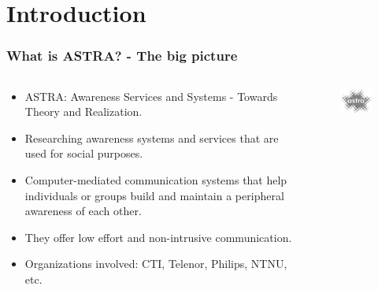 
\section{Introduction}

\begin{frame}
\frametitle{What is ASTRA? - The big picture} 

\begin{columns}

	\begin{column}{8cm}

		\begin{itemize}
		  \item ASTRA: Awareness Services and Systems - Towards Theory and Realization.
		  \item Researching awareness systems and services that are used for social
		  purposes.
		  \item Computer-mediated communication systems that help individuals or groups
		  build and maintain a peripheral awareness of each other.  
		  \item They offer low effort and non-intrusive communication.
		  \item Organizations involved: CTI, Telenor, Philips, NTNU, etc.
		\end{itemize}

	\end{column}

	\begin{column}{5cm}
    
		\begin{figure}
		 	\includegraphics[scale=0.5]{img/astra_logo.png}
		\end{figure}
    
    \end{column}

\end{columns}


\end{frame}


